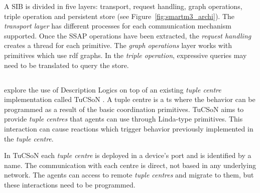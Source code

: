 A SIB is divided in five layers: transport, request handling, graph operations, triple operation and persistent store (see Figure~\ref{fig:smartm3_archi}).
The \emph{transport layer} has different processes for each communication mechanism supported.
Once the SSAP operations have been extracted, the \emph{request handling} creates a thread for each primitive.
The \emph{graph operations} layer works with primitives which use \acs{rdf} graphs.
In the \emph{triple operation}, expressive queries may need to be translated to query the store.





\subsection{\citeauthor{nardini_semantic_2013}}

\citet{nardini_semantic_2013} explore the use of Description Logics on top of an existing \emph{tuple centre} implementation called TuCSoN \cite{omicini_tucson:_1998}.
A tuple centre is a \ac{ts} where the behavior can be programmed as a result of the basic coordination primitives.
TuCSoN aims to provide \emph{tuple centres} that agents can use through Linda-type primitives.
This interaction can cause reactions which trigger behavior previously implemented in the \emph{tuple centre}.

In TuCSoN each \emph{tuple centre} is deployed in a device's port and is identified by a name.
The communication with each centre is direct, not based in any underlying network. %
The agents can access to remote \emph{tuple centres} and migrate to them, but these interactions need to be programmed.

